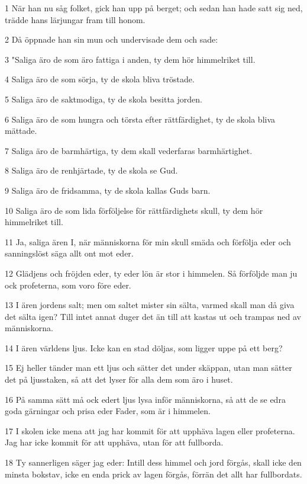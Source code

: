 \par 1 När han nu såg folket, gick han upp på berget; och sedan han hade satt sig ned, trädde hans lärjungar fram till honom.
\par 2 Då öppnade han sin mun och undervisade dem och sade:
\par 3 "Saliga äro de som äro fattiga i anden, ty dem hör himmelriket till.
\par 4 Saliga äro de som sörja, ty de skola bliva tröstade.
\par 5 Saliga äro de saktmodiga, ty de skola besitta jorden.
\par 6 Saliga äro de som hungra och törsta efter rättfärdighet, ty de skola bliva mättade.
\par 7 Saliga äro de barmhärtiga, ty dem skall vederfaras barmhärtighet.
\par 8 Saliga äro de renhjärtade, ty de skola se Gud.
\par 9 Saliga äro de fridsamma, ty de skola kallas Guds barn.
\par 10 Saliga äro de som lida förföljelse för rättfärdighets skull, ty dem hör himmelriket till.
\par 11 Ja, saliga ären I, när människorna för min skull smäda och förfölja eder och sanningslöst säga allt ont mot eder.
\par 12 Glädjens och fröjden eder, ty eder lön är stor i himmelen. Så förföljde man ju ock profeterna, som voro före eder.
\par 13 I ären jordens salt; men om saltet mister sin sälta, varmed skall man då giva det sälta igen? Till intet annat duger det än till att kastas ut och trampas ned av människorna.
\par 14 I ären världens ljus. Icke kan en stad döljas, som ligger uppe på ett berg?
\par 15 Ej heller tänder man ett ljus och sätter det under skäppan, utan man sätter det på ljusstaken, så att det lyser för alla dem som äro i huset.
\par 16 På samma sätt må ock edert ljus lysa inför människorna, så att de se edra goda gärningar och prisa eder Fader, som är i himmelen.
\par 17 I skolen icke mena att jag har kommit för att upphäva lagen eller profeterna. Jag har icke kommit för att upphäva, utan för att fullborda.
\par 18 Ty sannerligen säger jag eder: Intill dess himmel och jord förgås, skall icke den minsta bokstav, icke en enda prick av lagen förgås, förrän det allt har fullbordats.
